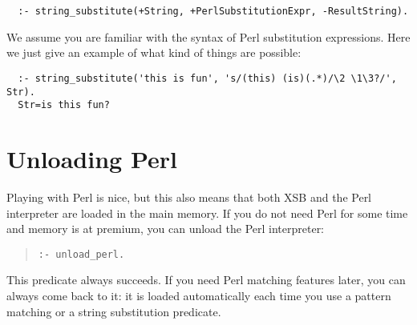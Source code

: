 \begin{verbatim}
  :- string_substitute(+String, +PerlSubstitutionExpr, -ResultString).
\end{verbatim}

We assume you are familiar with the syntax of Perl substitution
expressions. Here we just give an example of what kind of things are
possible:

\begin{verbatim}
  :- string_substitute('this is fun', 's/(this) (is)(.*)/\2 \1\3?/', Str).
  Str=is this fun?
\end{verbatim}

\section{Unloading Perl}
Playing with Perl is nice, but this also means that both XSB and the Perl
interpreter  are loaded in the main memory. If you do not need Perl
for some time and memory is at premium, you can unload the Perl
interpreter:
\begin{quote}
   {\tt :- unload\_perl. }
\end{quote}
This predicate always succeeds. If you need Perl matching features later,
you can always come back to it: it is loaded automatically each time you
use a pattern matching or a string substitution predicate.

